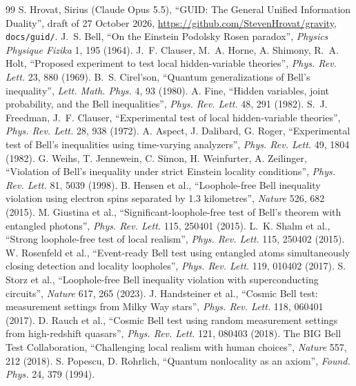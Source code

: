 \documentclass[11pt,a4paper]{article}
\theoremstyle{definition}
\theoremstyle{remark}
\begin{document}
\begin{thebibliography}{99}\small
{} S. Hrovat, Sirius (Claude Opus 5.5), ``GUID: The General Unified Information Duality'', draft of 27 October 2026,
\url{https://github.com/StevenHrovat/gravity}, \texttt{docs/guid/}.
 J.~S. Bell, ``On the Einstein Podolsky Rosen paradox'', \emph{Physics Physique Fizika} 1, 195 (1964).
 J.~F. Clauser, M.~A. Horne, A. Shimony, R.~A. Holt, ``Proposed experiment to test local hidden-variable theories'',
\emph{Phys. Rev. Lett.} 23, 880 (1969).
 B.~S. Cirel'son, ``Quantum generalizations of Bell's inequality'', \emph{Lett. Math. Phys.} 4, 93 (1980).
 A. Fine, ``Hidden variables, joint probability, and the Bell inequalities'', \emph{Phys. Rev. Lett.} 48, 291 (1982).
 S.~J. Freedman, J.~F. Clauser, ``Experimental test of local hidden-variable theories'', \emph{Phys. Rev. Lett.} 28, 938 (1972).
 A. Aspect, J. Dalibard, G. Roger, ``Experimental test of Bell's inequalities using time-varying analyzers'', \emph{Phys.
Rev. Lett.} 49, 1804 (1982).
 G. Weihs, T. Jennewein, C. Simon, H. Weinfurter, A. Zeilinger, ``Violation of Bell's inequality under strict Einstein
locality conditions'', \emph{Phys. Rev. Lett.} 81, 5039 (1998).
 B. Hensen et al., ``Loophole-free Bell inequality violation using electron spins separated by 1.3 kilometres'',
\emph{Nature} 526, 682 (2015).
 M. Giustina et al., ``Significant-loophole-free test of Bell's theorem with entangled photons'', \emph{Phys. Rev. Lett.}
115, 250401 (2015).
 L.~K. Shalm et al., ``Strong loophole-free test of local realism'', \emph{Phys. Rev. Lett.} 115, 250402 (2015).
 W. Rosenfeld et al., ``Event-ready Bell test using entangled atoms simultaneously closing detection and locality
loopholes'', \emph{Phys. Rev. Lett.} 119, 010402 (2017).
 S. Storz et al., ``Loophole-free Bell inequality violation with superconducting circuits'', \emph{Nature} 617, 265 (2023).
 J. Handsteiner et al., ``Cosmic Bell test: measurement settings from Milky Way stars'', \emph{Phys. Rev. Lett.}
118, 060401 (2017).
 D. Rauch et al., ``Cosmic Bell test using random measurement settings from high-redshift quasars'', \emph{Phys. Rev.
Lett.} 121, 080403 (2018).
 The BIG Bell Test Collaboration, ``Challenging local realism with human choices'', \emph{Nature} 557, 212 (2018).
 S. Popescu, D. Rohrlich, ``Quantum nonlocality as an axiom'', \emph{Found. Phys.} 24, 379 (1994).

\end{thebibliography}
\end{document}
